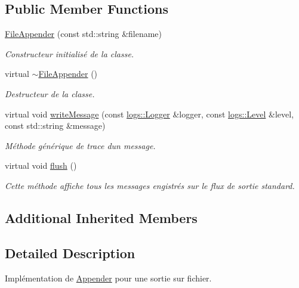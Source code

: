 \subsection*{Public Member Functions}
\begin{DoxyCompactItemize}
\item 
\hyperlink{classlogs_1_1FileAppender_a450b9bdc315236b7f1b3d45bf2689c91}{File\+Appender} (const std\+::string \&filename)
\begin{DoxyCompactList}\small\item\em Constructeur initialisé de la classe. \end{DoxyCompactList}\item 
\mbox{\label{classlogs_1_1FileAppender_adf591d230e1d1fe87ea57c4d9ac978e3}} 
virtual \hyperlink{classlogs_1_1FileAppender_adf591d230e1d1fe87ea57c4d9ac978e3}{$\sim$\+File\+Appender} ()
\begin{DoxyCompactList}\small\item\em Destructeur de la classe. \end{DoxyCompactList}\item 
virtual void \hyperlink{classlogs_1_1FileAppender_ab0dad2dab0f7d659321a574bdfa769c7}{write\+Message} (const \hyperlink{classlogs_1_1Logger}{logs\+::\+Logger} \&logger, const \hyperlink{classlogs_1_1Level}{logs\+::\+Level} \&level, const std\+::string \&message)
\begin{DoxyCompactList}\small\item\em Méthode générique de trace d\textquotesingle{}un message. \end{DoxyCompactList}\item 
\mbox{\label{classlogs_1_1FileAppender_ae8472809e267e97fd94aa9b1b8724367}} 
virtual void \hyperlink{classlogs_1_1FileAppender_ae8472809e267e97fd94aa9b1b8724367}{flush} ()
\begin{DoxyCompactList}\small\item\em Cette méthode affiche tous les messages engistrés sur le flux de sortie standard. \end{DoxyCompactList}\end{DoxyCompactItemize}
\subsection*{Additional Inherited Members}


\subsection{Detailed Description}
Implémentation de \hyperlink{classlogs_1_1Appender}{Appender} pour une sortie sur fichier. 

